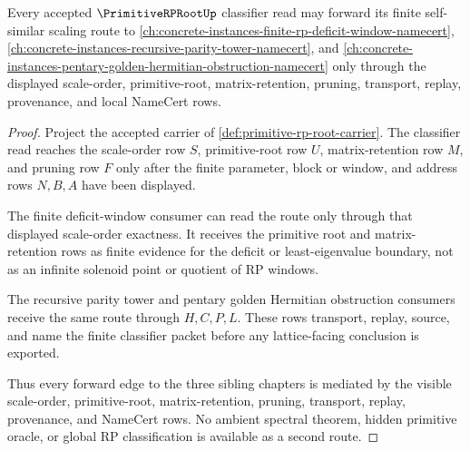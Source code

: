 \begin{theorem}
\label{thm:primitive-rp-root-self-similar-forward-route}
Every accepted $\PrimitiveRPRootUp$ classifier read may forward its finite self-similar scaling route to \autoref{ch:concrete-instances-finite-rp-deficit-window-namecert}, \autoref{ch:concrete-instances-recursive-parity-tower-namecert}, and \autoref{ch:concrete-instances-pentary-golden-hermitian-obstruction-namecert} only through the displayed scale-order, primitive-root, matrix-retention, pruning, transport, replay, provenance, and local NameCert rows.
\end{theorem}
\begin{proof}
Project the accepted carrier of \autoref{def:primitive-rp-root-carrier}. The classifier read reaches the scale-order row $S$, primitive-root row $U$, matrix-retention row $M$, and pruning row $F$ only after the finite parameter, block or window, and address rows $N,B,A$ have been displayed.

The finite deficit-window consumer can read the route only through that displayed scale-order exactness. It receives the primitive root and matrix-retention rows as finite evidence for the deficit or least-eigenvalue boundary, not as an infinite solenoid point or quotient of RP windows.

The recursive parity tower and pentary golden Hermitian obstruction consumers receive the same route through $H,C,P,L$. These rows transport, replay, source, and name the finite classifier packet before any lattice-facing conclusion is exported.

Thus every forward edge to the three sibling chapters is mediated by the visible scale-order, primitive-root, matrix-retention, pruning, transport, replay, provenance, and NameCert rows. No ambient spectral theorem, hidden primitive oracle, or global RP classification is available as a second route.
\end{proof}



